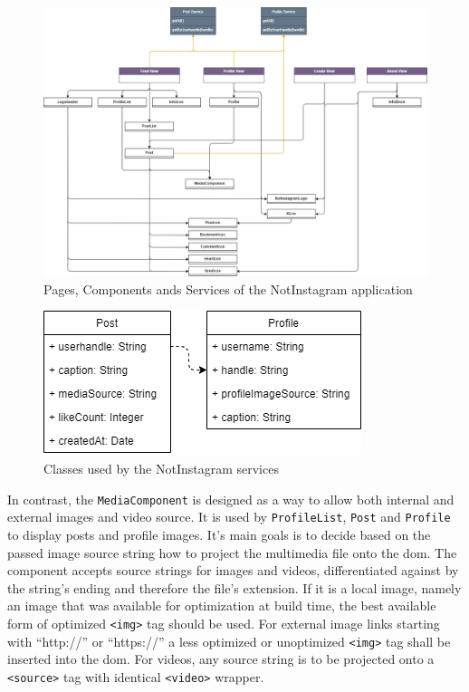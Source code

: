 \documentclass[a4paper, 10pt]{article}
\begin{document}
\begin{figure}
  \includegraphics[width=\linewidth]{diagrams/uml.png}
  \caption{Pages, Components ands Services of the NotInstagram application}\label{fig:uml}
\end{figure}
\begin{figure}
  \begin{center}
    \includegraphics[width=0.5\linewidth]{diagrams/entities.png}
  \end{center}
  \caption{Classes used by the NotInstagram services}\label{fig:classes}
\end{figure}

In contrast, the \verb|MediaComponent| is designed as a way to allow both internal and external images and video source.
It is used by \verb|ProfileList|, \verb|Post| and \verb|Profile| to display posts and profile images.
It's main goals is to decide based on the passed image source string how to project the multimedia file onto the \acrshort{dom}.
The component accepts source strings for images and videos, differentiated against by the string's ending and therefore the file's extension.
If it is a local image, namely an image that was available for optimization at build time, the best available form of optimized \verb|<img>| tag should be used.
For external image links starting with \enquote{http://} or \enquote{https://} a less optimized or unoptimized \verb|<img>| tag shall be inserted into the \acrshort{dom}.
For videos, any source string is to be projected onto a \verb|<source>| tag with identical \verb|<video>| wrapper.
\end{document}

